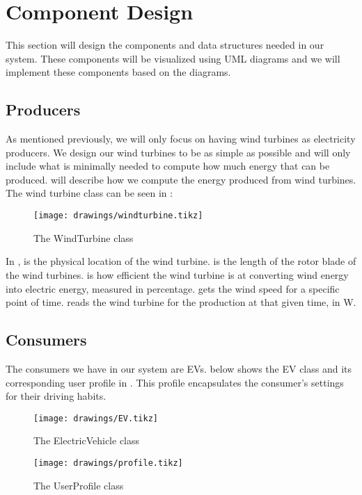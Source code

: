 \section{Component Design}\label{sec:components}
This section will design the components and data structures needed in our system. These components will be visualized using UML diagrams and we will implement these components based on the diagrams. 

\subsection{Producers}
As mentioned previously, we will only focus on having wind turbines as electricity producers. We design our wind turbines to be as simple as possible and will only include what is minimally needed to compute how much energy that can be produced.  will describe how we compute the energy produced from wind turbines. The wind turbine class can be seen in :

\begin{figure}[!htb]
	\centering
	\texttt{[image: drawings/windturbine.tikz]}
	\caption{The WindTurbine class}\label{fig:UMLWT}
\end{figure}

In ,  is the physical location of the wind turbine.  is the length of the rotor blade of the wind turbines.  is how efficient the wind turbine is at converting wind energy into electric energy, measured in percentage.  gets the wind speed for a specific point of time.  reads the wind turbine for the production at that given time, in \si{\watt}.

\subsection{Consumers}
The consumers we have in our system are EVs.  below shows the EV class and its corresponding user profile in . This profile encapsulates the consumer's settings for their driving habits.

\begin{figure}[!htb]
	\centering
	\begin{minipage}[t]{0.49\textwidth}
		\centering
		\texttt{[image: drawings/EV.tikz]}
		\caption{The ElectricVehicle class}\label{fig:UMLEV}
	\end{minipage}
	\begin{minipage}[t]{0.49\textwidth}
		\centering
		\texttt{[image: drawings/profile.tikz]}
		\caption{The UserProfile class}\label{fig:UMLprofile}
	\end{minipage}
\end{figure}

